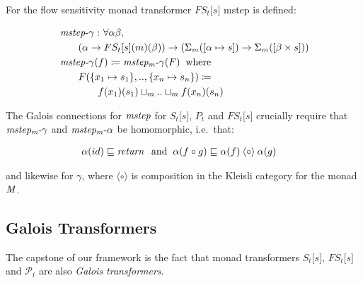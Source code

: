 For the flow sensitivity monad transformer $FS _t  \lbrack s \rbrack $
mstep is defined:

\small\begin{align*}
&\hspace{0em}  \operatorname{\mathit{mstep-\gamma}}   \mathbin{\colon}   \forall   \alpha   \beta ,  \\
&\hspace{2em} ( \alpha   \rightarrow  FS _t  \lbrack s \rbrack (m)( \beta ))  \rightarrow  ( \Sigma  _m ( \lbrack  \alpha   \mapsto  s \rbrack )  \rightarrow   \Sigma  _m ( \lbrack  \beta   \times  s \rbrack )) \\
&\hspace{0em}  \operatorname{\mathit{mstep-\gamma}} (f)  \coloneqq   \operatorname{\mathit{mstep_m-\gamma}} (F)  \;\;\text{where}\;\;   \\
&\hspace{2em} F( \{ x _1   \mapsto  s _1  \} ,.., \{ x _n   \mapsto  s _n  \} )  \coloneqq   \\
&\hspace{4em} f(x _1 )(s _1 )  \sqcup  _m  ..  \sqcup  _m  f(x _n )(s _n )
\end{align*}\normalsize

The Galois connections for $ \operatorname{\mathit{mstep}} $ for
$S _t  \lbrack s \rbrack $, $P _t $ and $FS _t  \lbrack s \rbrack $
crucially require that $ \operatorname{\mathit{mstep_m-\gamma}} $ and
$ \operatorname{\mathit{mstep_m-\alpha}} $ be homomorphic, i.e.~that:

\small\begin{align*}
&\hspace{0em}  \alpha (id)  \sqsubseteq   \operatorname{\mathit{return}}   \;\;\text{and}\;\;   \alpha (f  \circ  g)  \sqsubseteq   \alpha (f)  \mathbin{\langle \circ \rangle}   \alpha (g)
\end{align*}\normalsize

and likewise for $ \gamma $, where $ \mathbin{\langle \circ \rangle} $
is composition in the Kleisli category for the monad $ \operatorname{\mathit{M}} $.

\par

\subsection{Galois Transformers}\label{galois-transformers-1}

\par

The capstone of our framework is the fact that monad transformers
$S _t  \lbrack s \rbrack $, $FS _t  \lbrack s \rbrack $ and
$ \mathcal{P}  _t $ are also \emph{Galois transformers}.

